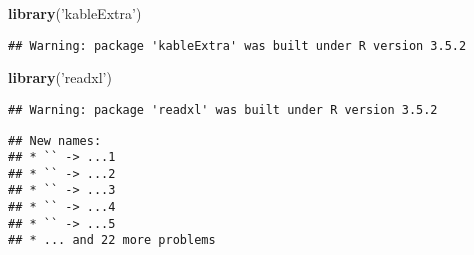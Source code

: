 \documentclass[
]{article}
\newenvironment{Shaded}{\begin{snugshade}}{\end{snugshade}}
\newcommand{\DataTypeTok}[1]{\textcolor[rgb]{0.13,0.29,0.53}{#1}}
\newcommand{\KeywordTok}[1]{\textcolor[rgb]{0.13,0.29,0.53}{\textbf{#1}}}
\newcommand{\NormalTok}[1]{#1}
\newcommand{\OperatorTok}[1]{\textcolor[rgb]{0.81,0.36,0.00}{\textbf{#1}}}
\newcommand{\OtherTok}[1]{\textcolor[rgb]{0.56,0.35,0.01}{#1}}
\newcommand{\StringTok}[1]{\textcolor[rgb]{0.31,0.60,0.02}{#1}}
\begin{document}
\begin{Shaded}
\begin{Highlighting}[]
\KeywordTok{library}\NormalTok{(}\StringTok{'kableExtra'}\NormalTok{)}
\end{Highlighting}
\end{Shaded}

\begin{verbatim}
## Warning: package 'kableExtra' was built under R version 3.5.2
\end{verbatim}

\begin{Shaded}
\begin{Highlighting}[]
\KeywordTok{library}\NormalTok{(}\StringTok{'readxl'}\NormalTok{)}
\end{Highlighting}
\end{Shaded}

\begin{verbatim}
## Warning: package 'readxl' was built under R version 3.5.2
\end{verbatim}

\begin{Shaded}
\end{Shaded}

\begin{verbatim}
## New names:
## * `` -> ...1
## * `` -> ...2
## * `` -> ...3
## * `` -> ...4
## * `` -> ...5
## * ... and 22 more problems
\end{verbatim}
\end{document}
